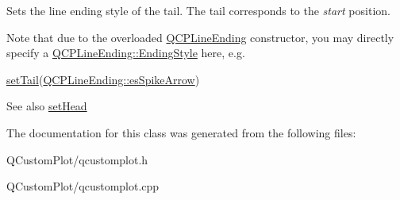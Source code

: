 Sets the line ending style of the tail. The tail corresponds to the {\itshape start} position.

Note that due to the overloaded \mbox{\hyperlink{class_q_c_p_line_ending}{Q\+C\+P\+Line\+Ending}} constructor, you may directly specify a \mbox{\hyperlink{class_q_c_p_line_ending_a5ef16e6876b4b74959c7261d8d4c2cd5}{Q\+C\+P\+Line\+Ending\+::\+Ending\+Style}} here, e.\+g.
\begin{DoxyCode}
\mbox{\hyperlink{class_q_c_p_item_curve_ac3488d8b1a6489c845dc5bff3ef71124}{setTail}}(\mbox{\hyperlink{class_q_c_p_line_ending_a5ef16e6876b4b74959c7261d8d4c2cd5ab9964d0d03f812d1e79de15edbeb2cbf}{QCPLineEnding::esSpikeArrow}}) 
\end{DoxyCode}


\begin{DoxySeeAlso}{See also}
\mbox{\hyperlink{class_q_c_p_item_curve_a08a30d9cdd63995deea3d9e20430676f}{set\+Head}} 
\end{DoxySeeAlso}


The documentation for this class was generated from the following files\+:\begin{DoxyCompactItemize}
\item 
Q\+Custom\+Plot/qcustomplot.\+h\item 
Q\+Custom\+Plot/qcustomplot.\+cpp\end{DoxyCompactItemize}
